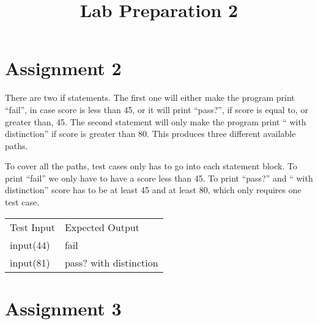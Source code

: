 \documentclass[a4paper]{article}
\title{Lab Preparation 2}
\author{}
\date{}
\begin{document}
\maketitle

\section*{Assignment 2}

There are two if statements. The first one will either make the program print ``fail'', in case score is less than 45, or it will print ``pass?'', if score is equal to, or greater than, 45. The second statement will only make the program print `` with distinction'' if score is greater than 80. This produces three different available paths.

To cover all the paths, test cases only has to go into each statement block. To print ``fail'' we only have to have a score less than 45. To print ``pass?'' and `` with distinction'' score has to be at least 45 and at least 80, which only requires one test case. 

\begin{table}[h]
	\begin{tabular}{ll}
		Test Input 	& Expected Output\\
		input(44)	& fail\\
		input(81)	& pass? with distinction\\
	\end{tabular}
\end{table}

\section*{Assignment 3}
\end{document}
